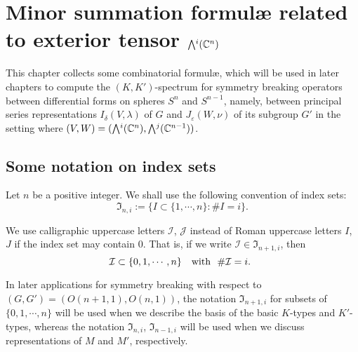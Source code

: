 \newpage
\section{Minor summation formul{\ae}
 related to exterior tensor $\Exterior^i({\mathbb{C}}^n)$}
\label{sec:section9}

This chapter collects some combinatorial formul{\ae}, 
 which will be used in later chapters to compute the $(K,K')$-spectrum
 for symmetry breaking operators
 between differential forms 
 on spheres $S^n$ and $S^{n-1}$, 
 namely,
 between principal series representations
 $I_{\delta}(V,\lambda)$ of $G$
 and $J_{\varepsilon}(W,\nu)$ of its subgroup $G'$
 in the setting where $(V,W)=(\Exterior^i({\mathbb{C}}^n), \Exterior^j({\mathbb{C}}^{n-1}))$.  
\subsection{Some notation on index sets}
\label{subsec:index}

Let $n$ be a positive integer.  
We shall use the following convention 
 of index sets:
\begin{equation}
\label{eqn:Indexni}
{\mathfrak{I}}_{n,i}
:=\{I \subset \{1,\cdots,n\}
  : \# I =i\}.   
\end{equation}



\begin{convention}
\label{conv:index}
We use calligraphic uppercase letters 
 ${\mathcal {I}}$, ${\mathcal{J}}$
 instead of Roman uppercase letters $I$, $J$
 if the index set may contain 0.  
That is, 
if we write ${\mathcal{I}} \in {\mathfrak{I}}_{n+1,i}$, 
then 
\[
\text{${\mathcal{I}} \subset \{0,1,\cdots,n\}$
\,\, with \,\,$\# {\mathcal{I}} =i$.  
}
\]
\end{convention}
In later applications for symmetry breaking 
 with respect to $(G,G')=(O(n+1,1),O(n,1))$, 
 the notation ${\mathfrak{I}}_{n+1,i}$
 for subsets of $\{0,1,\cdots,n\}$ will be used
 when we describe the basis
 of the basic $K$-types and $K'$-types, 
 whereas the notation ${\mathfrak{I}}_{n,i}$, 
 ${\mathfrak{I}}_{n-1,i}$
 will be used 
 when we discuss representations of $M$ and $M'$, 
respectively.  



